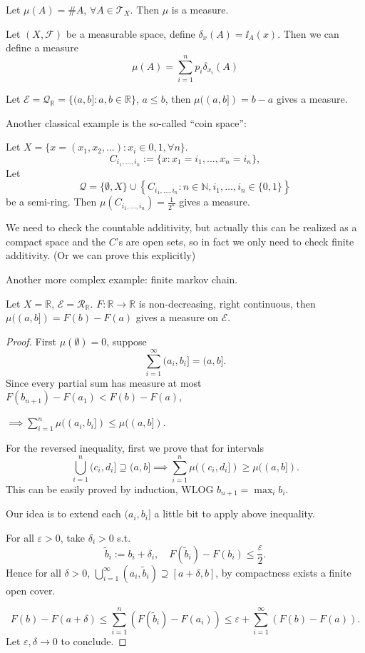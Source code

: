 \begin{example}
    Let $\mu(A)=\#A$,  $\forall A\in \mathscr{T}_X$.
	Then $\mu$ is a measure.
\end{example}

\begin{example}
    Let $(X,\mathscr{F})$ be a measurable space,
	define $\delta_x(A) = \ii_A(x)$. Then we can define a measure
	\[
	\mu(A) = \sum_{i=1}^{n} p_i\delta_{x_i}(A)
	\]
\end{example}

\begin{example}[Length]
	Let $\mathscr{E}=\mathscr{Q}_{\mathbb{R}}=\{(a,b] : a,b\in \mathbb{R}\}$, $a\le b$,
	then $\mu((a,b]) = b - a$ gives a measure.
\end{example}

Another classical example is the so-called ``coin space'':

Let $X=\{x=(x_1,x_2,\dots): x_i\in {0,1}, \forall n\}$.
\[
C_{i_1,\dots,i_n}:=\{x:x_1=i_1,\dots, x_n=i_n\},
\]
Let
\[
\mathscr{Q} = \{\emptyset,X\}\cup
\left\{C_{i_1,\dots,i_n}:n\in \mathbb{N}, i_1,\dots,i_n\in \{0,1\}\right\}
\]
be a semi-ring.
Then $\mu(C_{i_1,\dots,i_n}) = \frac{1}{2^n}$ gives a measure.

We need to check the countable additivity, but actually
this can be realized as a compact space and the $C$'s are open sets,
so in fact we only need to check finite additivity.
(Or we can prove this explicitly)

Another more complex example: finite markov chain.

\begin{proposition}
	Let $X=\mathbb{R}$, $\mathscr{E}=\mathscr{R}_{\mathbb{R}}$.
	$F: \mathbb{R}\to \mathbb{R}$ is non-decreasing, right continuous, then
	$\mu((a,b]) = F(b)-F(a)$ gives a measure on $\mathscr{E}$.
\end{proposition}
\begin{proof}[Proof]
    First $\mu(\emptyset)=0$, suppose
	 \[
		 \sum_{i=1}^{\infty} (a_i,b_i] = (a,b]. 
	\]
	Since every partial sum has measure at most $F(b_{n+1})-F(a_1) < F(b)-F(a)$,

	$\implies \sum_{i=1}^{n} \mu((a_i,b_i]) \le \mu((a,b])$.

	For the reversed inequality, first we prove that for intervals
	\[
		\bigcup_{i=1}^n (c_i,d_i] \supseteq (a,b] \implies
		\sum_{i=1}^{n} \mu((c_i,d_i]) \ge \mu((a,b]).
	\]
	This can be easily proved by induction, WLOG $b_{n+1} = \max_i b_i$.

	Our idea is to extend each $(a_i, b_i]$ a little bit to apply above inequality.

	For all  $\varepsilon>0$, take  $\delta_i>0$ s.t.
	 \[
	\tilde{b}_i := b_i + \delta_i, \quad F(\tilde{b}_i) - F(b_i) \le \frac{\varepsilon}{2}.
	\]
	Hence for all $\delta>0$, $\bigcup_{i=1}^\infty (a_i, \tilde{b}_i)\supseteq [a+\delta,b]$,
	by compactness exists a finite open cover.

	\[
	F(b) - F(a+\delta)\le \sum_{i=1}^{n} \left(F(\tilde b_i)-F(a_i)\right)\le
	\varepsilon+ \sum_{i=1}^{\infty} (F(b)-F(a)).
	\]
	Let $\varepsilon,\delta\to 0$ to conclude.
\end{proof}

